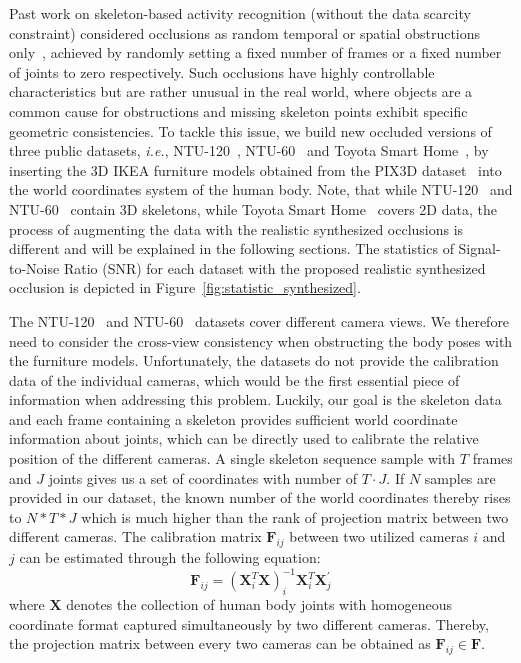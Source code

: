 \documentclass[lettersize,journal]{IEEEtran}
\begin{document}
Past work on skeleton-based activity recognition (without the data scarcity constraint) considered occlusions as random temporal or spatial obstructions only~\cite{song2019richly}, achieved by randomly setting a fixed number of frames or a fixed number of joints to zero respectively.
Such occlusions have highly controllable characteristics but are rather unusual in the real world, where objects are a common cause for obstructions and missing skeleton points exhibit specific geometric consistencies.
To tackle this issue, we build new occluded versions of three public datasets, \textit{i.e.}, NTU-120~\cite{liu2019ntu}, NTU-60~\cite{shahroudy2016ntu} and Toyota Smart Home~\cite{Das_2019_ICCV}, by inserting the 3D IKEA furniture models obtained from the PIX3D dataset~\cite{sun2018pix3d} into the world coordinates system of the human body.
Note, that while NTU-120~\cite{liu2019ntu} and NTU-60~\cite{shahroudy2016ntu} contain 3D skeletons, while Toyota Smart Home~\cite{Das_2019_ICCV} covers 2D data, the process of augmenting the data with the realistic synthesized occlusions is different and will be explained in the following sections.
The statistics of Signal-to-Noise Ratio (SNR) for each dataset with the proposed realistic synthesized occlusion is depicted in Figure~\ref{fig:statistic_synthesized}.

The NTU-120~\cite{liu2019ntu} and NTU-60~\cite{shahroudy2016ntu} datasets cover different camera views.
We therefore need to consider the cross-view consistency when obstructing the body poses with the furniture models. 
Unfortunately, the datasets do not provide the calibration data of the individual cameras, which would be the first essential piece of information when addressing this problem.
Luckily, our goal is the skeleton data and each frame containing a skeleton provides sufficient world coordinate information about joints, which can be directly used to calibrate the relative position of the different cameras.
A single skeleton sequence sample with $T$ frames and $J$ joints gives us a set of coordinates with number of $T\cdot J$.
If $N$ samples are provided in our dataset, the known number of the world coordinates thereby rises to $N*T*J$ which is much higher than the rank of projection matrix between two different cameras. 
The calibration matrix $\textbf{F}_{ij}$ between two utilized cameras $i$ and $j$ can be estimated through the following equation:
\begin{equation}
    \mathbf{F}_{ij} = (\mathbf{X}^{T}_{i} \mathbf{X})^{-1}_{i}\mathbf{X}^{T}_{i} \mathbf{X}^{'}_{j}
\end{equation}
where $\mathbf{X}$ denotes the collection of human body joints with homogeneous coordinate format captured simultaneously by two different cameras. 
Thereby, the projection matrix between every two cameras can be obtained as $\textbf{F}_{ij}\in \textbf{F}$. 
\end{document}
